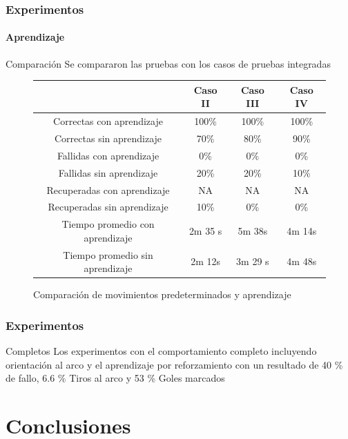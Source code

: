 \documentclass{beamer}
\begin{document}
\begin{frame}
  \frametitle{Experimentos}
  \framesubtitle{Aprendizaje}
  \begin{block}{Comparaci\'on}
	Se compararon las pruebas con los casos de pruebas integradas
\end{block}

\begin{figure}
\centering
\begin{tabular}{|c|c|c|c|}
\hline  & Caso II & Caso III & Caso IV \\ 
\hline 
Correctas con aprendizaje & 100\% & 100\% & 100\% \\ 
\hline 
Correctas sin aprendizaje & 70\% & 80\% & 90\% \\ 
\hline 
Fallidas con aprendizaje & 0\% & 0\% & 0\% \\ 
\hline 
Fallidas sin aprendizaje & 20\% & 20\% & 10\% \\ 
\hline 
Recuperadas con aprendizaje & NA & NA & NA \\ 
\hline 
Recuperadas sin aprendizaje & 10\% & 0\% & 0\% \\ 
\hline 
Tiempo promedio con aprendizaje & 2m 35 s & 5m 38s & 4m 14s \\ 
\hline 
Tiempo promedio sin aprendizaje & 2m 12s & 3m 29 s & 4m 48s \\
\hline
\end{tabular} 
\caption{Comparaci\'on de movimientos predeterminados y aprendizaje}
\label{tabla:comparacion}

\end{figure}

\end{frame}



\begin{frame}
\frametitle{Experimentos}
\begin{block}{Completos}
Los experimentos con el comportamiento completo incluyendo orientaci\'on al arco y el aprendizaje por reforzamiento con un resultado de 40 \% de fallo, 6.6 \% Tiros al arco y 53 \% Goles marcados
\end{block}


\end{frame}

\section{Conclusiones}
\end{document}
